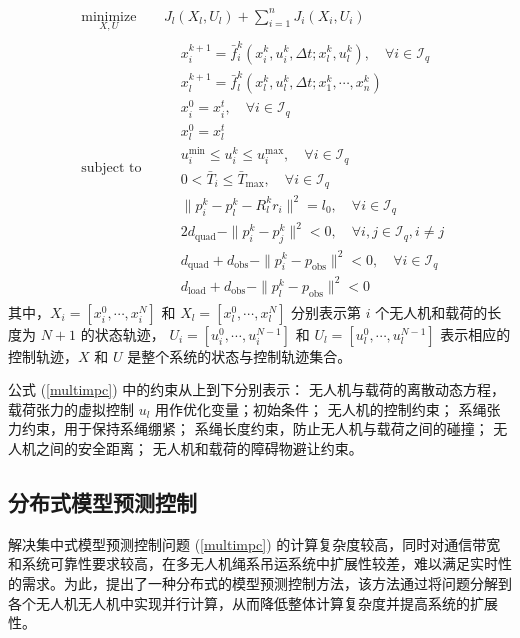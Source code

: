 \documentclass[lang=chs, degree=master, blindreview=false, winfonts=true]{yanputhesis}
\begin{document}
\begin{equation}
	\begin{aligned} 
	&\operatorname*{minimize}_{X,U}& & J_l(X_l, U_l) + \sum_{i=1}^n J_i(X_i, U_i)  \\
	&\text{subject to}& & \begin{aligned}
& x_i^{k+1} = \bar{f}_i^k(x_i^k, u_i^k, \Delta t; x_l^k, u_l^k), \quad \forall i \in \mathcal{I}_q \\
& x_l^{k+1} = \bar{f}_l^k(x_l^k, u_l^k, \Delta t; x_1^k, \cdots, x_n^k) \\
& x_i^0 = x_i^t, \quad \forall i \in \mathcal{I}_q \\
& x_l^0 = x_l^t \\
& u_i^{\min} \leq u_i^k \leq u_i^{\max}, \quad \forall i \in \mathcal{I}_q \\
& 0 < \bar{T}_i \leq \bar{T}_{\max}, \quad \forall i \in \mathcal{I}_q \\
& \|p_i^k - p_l^k - R_l^k r_i\|^2 = l_0, \quad \forall i \in \mathcal{I}_q \\
& 2d_\text{quad} - \|p_i^k - p_j^k\|^2 < 0, \quad \forall i, j \in \mathcal{I}_q, i \neq j \\
& d_\text{quad} + d_\text{obs} - \|p_i^k - p_\text{obs}\|^2 < 0, \quad \forall i \in \mathcal{I}_q \\
& d_\text{load} + d_\text{obs} - \|p_l^k - p_\text{obs}\|^2 < 0        
	\end{aligned}	
\end{aligned}
\label{multimpc}
\end{equation}
其中，\( X_i = \left[ x_i^0, \cdots, x_i^N \right] \) 和 \( X_l = \left[ x_l^0, \cdots, x_l^N \right] \) 分别表示第 \( i \) 个无人机和载荷的长度为 \( N+1 \) 的状态轨迹，
\( U_i = \left[ u_i^0, \cdots, u_i^{N-1} \right] \) 和 \( U_l = \left[ u_l^0, \cdots, u_l^{N-1} \right] \) 表示相应的控制轨迹，\( X \) 和 \( U \) 是整个系统的状态与控制轨迹集合。

公式 (\ref{multimpc}) 中的约束从上到下分别表示：
无人机与载荷的离散动态方程，载荷张力的虚拟控制 \( u_l \) 用作优化变量；初始条件；
无人机的控制约束；
系绳张力约束，用于保持系绳绷紧；
系绳长度约束，防止无人机与载荷之间的碰撞；
无人机之间的安全距离；
无人机和载荷的障碍物避让约束。

\subsection{分布式模型预测控制}
解决集中式模型预测控制问题 (\ref{multimpc}) 的计算复杂度较高，同时对通信带宽和系统可靠性要求较高，在多无人机绳系吊运系统中扩展性较差，难以满足实时性的需求。为此，提出了一种分布式的模型预测控制方法，该方法通过将问题分解到各个无人机无人机中实现并行计算，从而降低整体计算复杂度并提高系统的扩展性。
\end{document}
